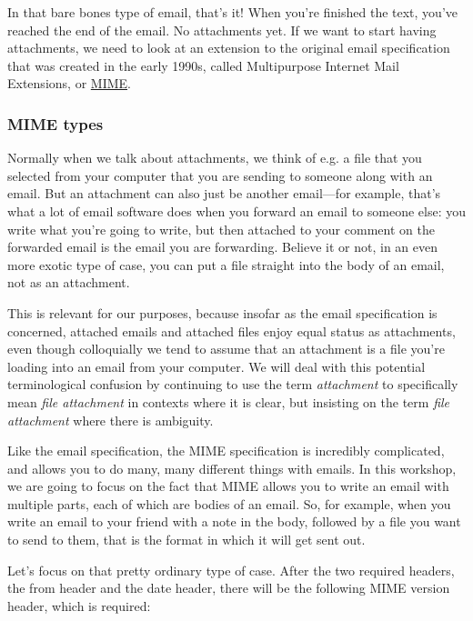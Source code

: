 \documentclass[11pt]{article}
\begin{document}
In that bare bones type of email, that's it!  When you're finished the
text, you've reached the end of the email.  No attachments yet.  If we
want to start having attachments, we need to look at an extension to
the original email specification that was created in the early 1990s,
called Multipurpose Internet Mail Extensions, or \href{https://datatracker.ietf.org/doc/html/rfc2045}{MIME}.

\subsubsection{MIME types}
\label{sec:org1bec629}

Normally when we talk about attachments, we think of e.g. a file that
you selected from your computer that you are sending to someone along
with an email.  But an attachment can also just be another email---for
example, that's what a lot of email software does when you forward an
email to someone else: you write what you're going to write, but then
attached to your comment on the forwarded email is the email you are
forwarding.  Believe it or not, in an even more exotic type of case,
you can put a file straight into the body of an email, not as an
attachment.

This is relevant for our purposes, because insofar as the email
specification is concerned, attached emails and attached files enjoy
equal status as attachments, even though colloquially we tend to
assume that an attachment is a file you're loading into an email from
your computer.  We will deal with this potential terminological
confusion by continuing to use the term \emph{attachment} to specifically
mean \emph{file attachment} in contexts where it is clear, but insisting on
the term \emph{file attachment} where there is ambiguity.

Like the email specification, the MIME specification is incredibly
complicated, and allows you to do many, many different things with
emails.  In this workshop, we are going to focus on the fact that MIME
allows you to write an email with multiple parts, each of which are
bodies of an email. So, for example, when you write an email to your
friend with a note in the body, followed by a file you want to send to
them, that is the format in which it will get sent out.

Let's focus on that pretty ordinary type of case. After the two
required headers, the from header and the date header, there will be
the following MIME version header, which is required:
\end{document}

